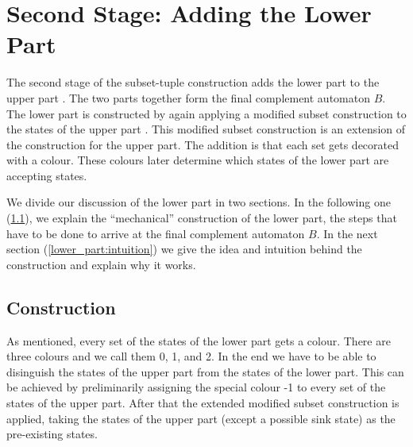 


\section{Second Stage: Adding the Lower Part}
The second stage of the subset-tuple construction adds the lower part to the upper part \Bp. The two parts together form the final complement automaton $B$. The lower part is constructed by again applying a modified subset construction to the states of the upper part \Bp. This modified subset construction is an extension of the construction for the upper part. The addition is that each set gets decorated with a colour. These colours later determine which states of the lower part are accepting states.

We divide our discussion of the lower part in two sections. In the following one (\ref{lower_part:steps}), we explain the ``mechanical'' construction of the lower part, the steps that have to be done to arrive at the final complement automaton $B$. In the next section (\ref{lower_part:intuition}) we give the idea and intuition behind the construction and explain why it works.

\subsection{Construction}
\label{lower_part:steps}
As mentioned, every set of the states of the lower part gets a colour. There are three colours and we call them 0, 1, and 2. In the end we have to be able to disinguish the states of the upper part from the states of the lower part. This can be achieved by preliminarily assigning the special colour -1 to every set of the states of the upper part. After that the extended modified subset construction is applied, taking the states of the upper part (except a possible sink state) as the pre-existing states.

